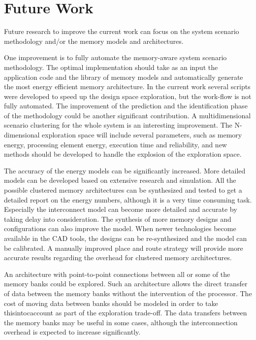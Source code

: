 \section{Future Work}

Future research to improve the current work can focus on the system scenario methodology and/or the memory models and architectures.

One improvement is to fully automate the memory-aware system scenario methodology.
The optimal implementation should take as an input the application code and the library of memory models and automatically generate the most energy efficient memory architecture.
In the current work several scripts were developed to speed up the design space exploration, but the work-flow is not fully automated.
The improvement of the prediction and the identification phase of the methodology could be another significant contribution. 
A multidimensional scenario clustering for the whole system is an interesting improvement.
The N-dimensional exploration space will include several parameters, such as memory energy, processing element energy, execution time and reliability, and new methods should be developed to handle the explosion of the exploration space.

The accuracy of the energy models can be significantly increased.
More detailed models can be developed based on extensive research and simulation.
All the possible clustered memory architectures can be synthesized and tested to get a detailed report on the energy numbers, although it is a very time consuming task.
Especially the interconnect model can become more detailed and accurate by taking delay into consideration.
The synthesis of more memory designs and configurations can also improve the model.
When newer technologies become available in the CAD tools, the designs can be re-synthesized and the model can be calibrated.
A manually improved place and route strategy will provide more accurate results regarding the overhead for clustered memory architectures.

An architecture with point-to-point connections between all or some of the memory banks could be explored. 
Such an architecture allows the direct transfer of data between the memory banks without the intervention of the processor.
The cost of moving data between banks should be modeled
in order to take thisintocaccount as part of the exploration trade-off.
The data transfers between the memory banks may be useful in some cases, although the interconnection overhead is expected to increase significantly.


%
%
